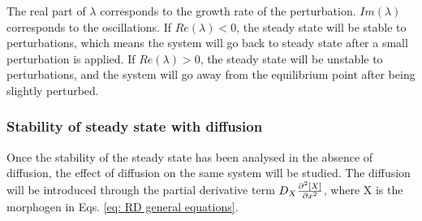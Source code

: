 The real part of $\lambda$ corresponds to the growth rate of the perturbation.
$Im(\lambda)$ corresponds to the oscillations.
If $Re(\lambda) < 0 $, the steady state will be stable to perturbations, which means the system will go back to steady state after a small perturbation is applied.
If $Re(\lambda) > 0 $, the steady state will be unstable to perturbations, and the system will go away from the equilibrium point after being slightly perturbed.
\subsubsection{Stability of steady state with diffusion}
Once the stability of the steady state has been analysed in the absence of diffusion, the effect of diffusion on the same system will be studied. The diffusion will be introduced through the partial derivative term $D_{X}\pdv[2]{[X]}{x}$, where X is the morphogen in Eqs. \eqref{eq: RD general equations}.
